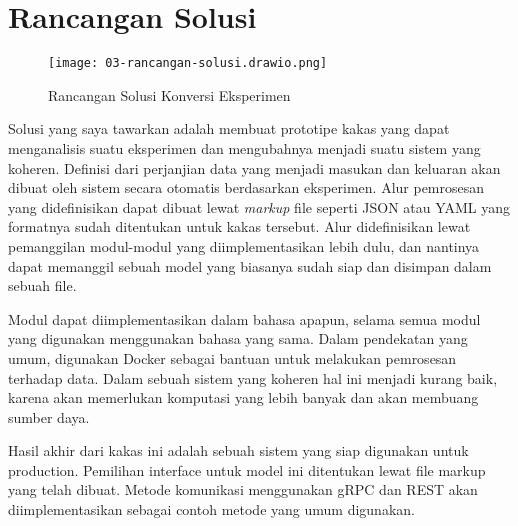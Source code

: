 \section{Rancangan Solusi}
\begin{figure}[h]
  \centering
  \texttt{[image: 03-rancangan-solusi.drawio.png]}
  \caption{Rancangan Solusi Konversi Eksperimen}
\end{figure}

Solusi yang saya tawarkan adalah membuat prototipe kakas yang dapat menganalisis suatu eksperimen dan mengubahnya menjadi suatu sistem yang koheren.
Definisi dari perjanjian data yang menjadi masukan dan keluaran akan dibuat oleh sistem secara otomatis berdasarkan eksperimen.
Alur pemrosesan yang didefinisikan dapat dibuat lewat \textit{markup} file seperti JSON atau YAML yang formatnya sudah ditentukan untuk kakas tersebut.
Alur didefinisikan lewat pemanggilan modul-modul yang diimplementasikan lebih dulu, dan nantinya dapat memanggil sebuah model yang biasanya sudah siap dan disimpan dalam sebuah file.

Modul dapat diimplementasikan dalam bahasa apapun, selama semua modul yang digunakan menggunakan bahasa yang sama.
Dalam pendekatan yang umum, digunakan Docker sebagai bantuan untuk melakukan pemrosesan terhadap data.
Dalam sebuah sistem yang koheren hal ini menjadi kurang baik, karena akan memerlukan komputasi yang lebih banyak dan akan membuang sumber daya.

Hasil akhir dari kakas ini adalah sebuah sistem yang siap digunakan untuk production.
Pemilihan interface untuk model ini ditentukan lewat file markup yang telah dibuat.
Metode komunikasi menggunakan gRPC dan REST akan diimplementasikan sebagai contoh metode yang umum digunakan.

